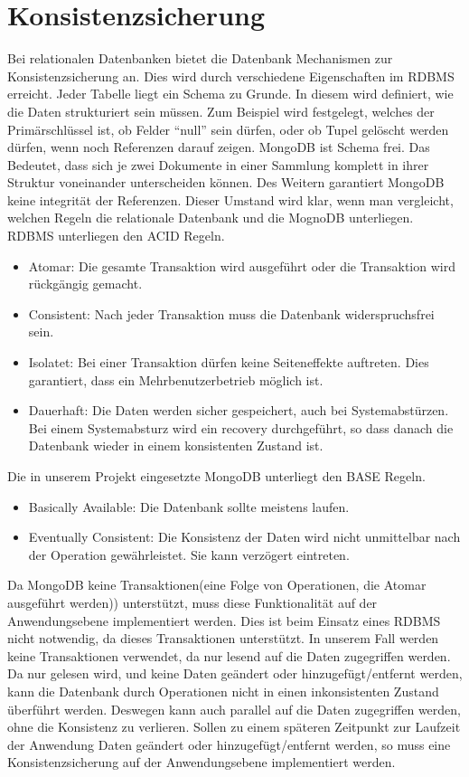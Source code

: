  \section{Konsistenzsicherung}
 Bei relationalen Datenbanken bietet die Datenbank Mechanismen zur
 Konsistenzsicherung an. Dies wird durch verschiedene Eigenschaften im RDBMS
 erreicht. Jeder Tabelle liegt ein Schema zu Grunde. In diesem wird definiert,
 wie die Daten strukturiert sein müssen. Zum Beispiel wird festgelegt, welches
 der Primärschlüssel ist, ob Felder ``null'' sein dürfen, oder ob Tupel gelöscht
 werden dürfen, wenn noch Referenzen darauf zeigen.
 MongoDB ist Schema frei. Das Bedeutet, dass sich je zwei Dokumente in einer
Sammlung  komplett in ihrer Struktur voneinander unterscheiden können.
 Des Weitern garantiert MongoDB keine integrität der Referenzen. Dieser Umstand
 wird klar, wenn man vergleicht, welchen Regeln die relationale Datenbank und
 die MognoDB unterliegen.
 RDBMS unterliegen den ACID Regeln. 
 \begin{itemize}
   \item Atomar: Die gesamte Transaktion wird ausgeführt oder die Transaktion
   wird rückgängig gemacht.
   \item Consistent: Nach jeder Transaktion muss die Datenbank widerspruchsfrei
   sein.
   \item Isolatet: Bei einer Transaktion dürfen keine Seiteneffekte
   auftreten. Dies garantiert, dass ein Mehrbenutzerbetrieb möglich ist.
   \item Dauerhaft: Die Daten werden sicher gespeichert, auch bei
   Systemabstürzen. Bei einem Systemabsturz wird ein recovery durchgeführt, so 
   dass danach die Datenbank wieder in einem konsistenten Zustand ist.
 \end{itemize}
 Die in unserem Projekt eingesetzte MongoDB unterliegt den BASE Regeln.
 \begin{itemize}
   \item Basically Available: Die Datenbank sollte meistens laufen.
   \item Eventually Consistent: Die Konsistenz der Daten wird nicht unmittelbar
   nach der Operation gewährleistet. Sie kann verzögert eintreten.
\end{itemize}
Da MongoDB keine Transaktionen(eine Folge von Operationen, die Atomar
ausgeführt werden)) unterstützt, muss diese Funktionalität auf der
Anwendungsebene implementiert werden. Dies ist beim Einsatz eines RDBMS nicht
notwendig, da dieses Transaktionen unterstützt. In unserem Fall werden keine
Transaktionen verwendet, da nur lesend auf die Daten zugegriffen werden.
Da nur gelesen wird, und keine Daten geändert oder hinzugefügt/entfernt werden,
kann die Datenbank durch Operationen nicht in einen inkonsistenten Zustand
überführt werden. Deswegen kann auch parallel auf die Daten zugegriffen
werden, ohne die Konsistenz zu verlieren. Sollen zu einem späteren Zeitpunkt zur
Laufzeit der Anwendung Daten geändert oder hinzugefügt/entfernt werden,
 so muss eine Konsistenzsicherung auf der Anwendungsebene  implementiert werden.


 

		